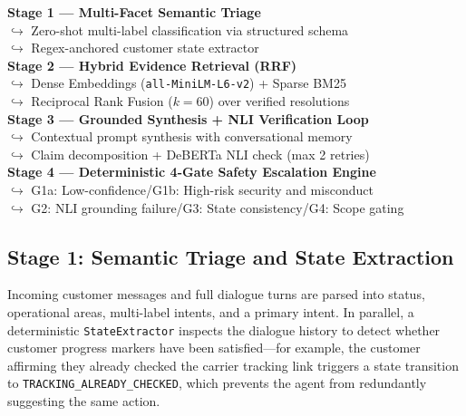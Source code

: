 \documentclass[10pt,twocolumn,a4paper]{article}
\begin{document}
\begin{tcolorbox}[hbox={Architecture Overview: 4-Stage Decoupled Pipeline}]
\small
\textbf{Stage 1 --- Multi-Facet Semantic Triage}\\
\hspace*{6pt}$\hookrightarrow$ Zero-shot multi-label classification via structured schema\\
\hspace*{6pt}$\hookrightarrow$ Regex-anchored customer state extractor\\[4pt]
\textbf{Stage 2 --- Hybrid Evidence Retrieval (RRF)}\\
\hspace*{6pt}$\hookrightarrow$ Dense Embeddings (\texttt{all-MiniLM-L6-v2}) + Sparse BM25\\
\hspace*{6pt}$\hookrightarrow$ Reciprocal Rank Fusion ($k{=}60$) over verified resolutions\\[4pt]
\textbf{Stage 3 --- Grounded Synthesis + NLI Verification Loop}\\
\hspace*{6pt}$\hookrightarrow$ Contextual prompt synthesis with conversational memory\\
\hspace*{6pt}$\hookrightarrow$ Claim decomposition + DeBERTa NLI check (max 2 retries)\\[4pt]
\textbf{Stage 4 --- Deterministic 4-Gate Safety Escalation Engine}\\
\hspace*{6pt}$\hookrightarrow$ G1a: Low-confidence\;\;/\;\;G1b: High-risk security and misconduct\\
\hspace*{6pt}$\hookrightarrow$ G2: NLI grounding failure\;\;/\;\;G3: State consistency\;\;/\;\;G4: Scope gating
\end{tcolorbox}
\vspace{-2pt}
\label{fig:arch}

\subsection{Stage 1: Semantic Triage and State Extraction}
Incoming customer messages and full dialogue turns are parsed into
status, operational areas, multi-label intents, and a primary intent.
In parallel, a deterministic \texttt{StateExtractor} inspects the
dialogue history to detect whether customer progress markers have been
satisfied---for example, the customer affirming they already checked
the carrier tracking link triggers a state transition to
\texttt{TRACKING\_ALREADY\_CHECKED}, which prevents the agent from
redundantly suggesting the same action.
\end{document}
